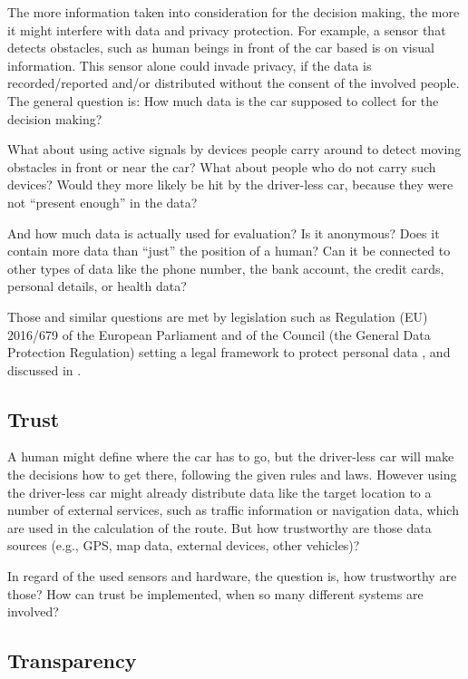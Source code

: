 The more information taken into consideration for the decision making, the more it might interfere with data and privacy protection. For example, a sensor that detects obstacles, such as human beings in front of the car based is on visual information. This sensor alone could invade privacy, if the data is recorded/reported and/or distributed without the consent of the involved people. The general question is: How much data is the car supposed to collect for the decision making?

What about using active signals by devices people carry around to detect moving obstacles in front or near the car? What about people who do not carry such devices? Would they more likely be hit by the driver-less car, because they were not \enquote{present enough} in the data?

And how much data is actually used for evaluation? Is it anonymous? Does it contain more data than \enquote{just} the position of a human? Can it be connected to other types of data like the phone number, the bank account, the credit cards, personal details, or health data?

Those and similar questions are met by legislation such as Regulation (EU) 2016/679 of the European Parliament and of the Council (the General Data Protection Regulation) setting a legal framework to protect personal data \cite{EuropeanUnion2016}, and discussed in \cite{doi:10.1093/idpl/ipx005}.


\subsection{Trust}
\label{sec:EAofTC:Trust}

A human might define where the car has to go, but the driver-less car will make the decisions how to get there, following the given rules and laws. However using the driver-less car might already distribute data like the target location to a number of external services, such as traffic information or navigation data, which are used in the calculation of the route. But how trustworthy are those data sources (e.g., GPS, map data, external devices, other vehicles)? 

In regard of the used sensors and hardware, the question is, how trustworthy are those? How can trust be implemented, when so many different systems are involved? 


\subsection{Transparency}
\label{sec:EAofTC:Transparency}

